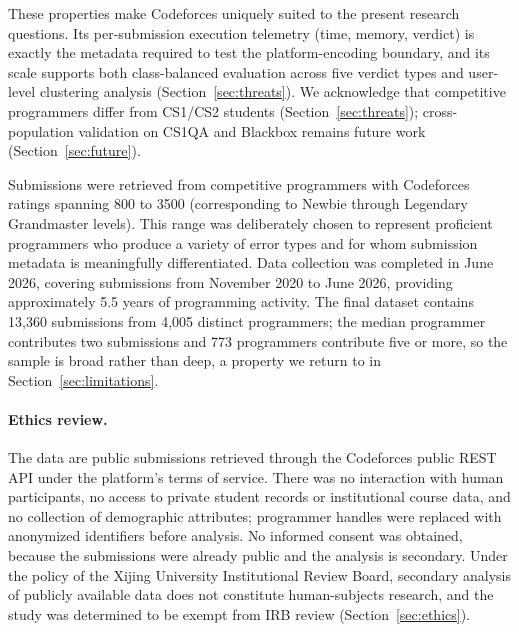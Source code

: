 \documentclass[acmsmall]{acmart}
\begin{document}
These properties make Codeforces uniquely suited to the present research
questions. Its per-submission execution telemetry (time, memory, verdict) is
exactly the metadata required to test the platform-encoding boundary, and its
scale supports both class-balanced evaluation across five verdict types and
user-level clustering analysis (Section~\ref{sec:threats}). We acknowledge that
competitive programmers differ from CS1/CS2 students (Section~\ref{sec:threats});
cross-population validation on CS1QA and Blackbox remains future work
(Section~\ref{sec:future}).

Submissions were retrieved from competitive programmers with Codeforces
ratings spanning 800 to 3500 (corresponding to Newbie through Legendary
Grandmaster levels). This range was deliberately chosen to represent
proficient programmers who produce a variety of error types and for whom
submission metadata is meaningfully differentiated. Data collection was
completed in June 2026, covering submissions from November 2020 to June
2026, providing approximately 5.5 years of programming activity. The final
dataset contains 13,360 submissions from 4,005 distinct programmers; the median
programmer contributes two submissions and 773 programmers contribute five or
more, so the sample is broad rather than deep, a property we return to in
Section~\ref{sec:limitations}.

\paragraph{Ethics review.} The data are public submissions retrieved through the
Codeforces public REST API under the platform's terms of service. There was no
interaction with human participants, no access to private student records or
institutional course data, and no collection of demographic attributes;
programmer handles were replaced with anonymized identifiers before analysis. No
informed consent was obtained, because the submissions were already public and
the analysis is secondary. Under the policy of the Xijing University
Institutional Review Board, secondary analysis of publicly available data does
not constitute human-subjects research, and the study was determined to be
exempt from IRB review (Section~\ref{sec:ethics}).
\end{document}
